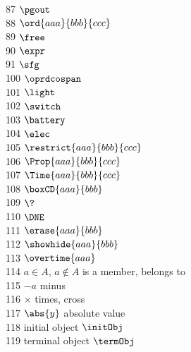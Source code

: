 \documentclass[11pt, book]{memoir}
\begin{document}
\begin{multicols}{3}
 87 $\pgout$ \\
 88 $\ord{aaa}{bbb}{ccc}$ \\
 89 $\free$ \\
 90 $\expr$ \\
 91 $\sfg$ \\
100 $\oprdcospan$ \\
101 $\light$ \\
102 $\switch$ \\
103 $\battery$ \\
104 $\elec$ \\
105 $\restrict{aaa}{bbb}{ccc}$ \\
106 $\Prop{aaa}{bbb}{ccc}$ \\
107 $\Time{aaa}{bbb}{ccc}$ \\
108 $\boxCD{aaa}{bbb}$ \\
109 $\?$ \\
110 $\DNE$ \\
111 $\erase{aaa}{bbb}$ \\
112 $\showhide{aaa}{bbb}$ \\
113 $\overtime{aaa}$ \\
114 $a \in A$, $a \notin A$ is a member, belongs to \\
115 $\minus a$ minus \\
116 $\times $ times, cross \\
117 $\abs{y}$ absolute value \\
118 initial object $\initObj$ \\
119 terminal object $\termObj$ \\

\end{multicols}
\end{document}
